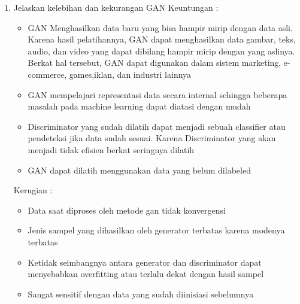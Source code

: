 \begin{enumerate}
    \item
    Jelaskan kelebihan dan kekurangan GAN
    Keuntungan : \hfill \break
    \begin{itemize}
        \item GAN Menghasilkan data baru yang bisa hampir mirip dengan data asli. Karena hasil pelatihannya, GAN dapat menghasilkan data gambar, teks, audio, dan video yang dapat dibilang hampir mirip dengan yang aslinya. Berkat hal tersebut, GAN dapat digunakan dalam sistem marketing, e-commerce, games,iklan, dan industri lainnya
        \item GAN mempelajari representasi data secara internal sehingga beberapa masalah pada machine learning dapat diatasi dengan mudah
        \item Discriminator yang sudah dilatih dapat menjadi sebuah classifier atau pendeteksi jika data sudah sesuai. Karena Discriminator yang akan menjadi tidak efisien berkat seringnya dilatih
        \item GAN dapat dilatih menggunakan data yang belum dilabeled
    \end{itemize}
    Kerugian : \hfill \break
    \begin{itemize}
        \item Data saat diproses oleh metode gan tidak konvergensi
        \item Jenis sampel yang dihasilkan oleh generator terbatas karena modenya terbatas
        \item Ketidak seimbangnya antara generator dan discriminator dapat menyebabkan overfitting atau terlalu dekat dengan hasil sampel
        \item Sangat sensitif dengan data yang sudah diinisiasi sebelumnya
    \end{itemize}
\end{enumerate}

